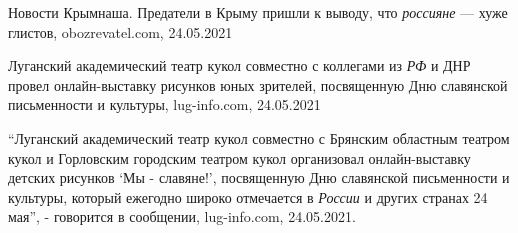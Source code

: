 
 
 
 
 
Новости Крымнаша. Предатели в Крыму пришли к выводу, что \emph{россияне} — хуже
глистов, obozrevatel.com, 24.05.2021

Луганский академический театр кукол совместно с коллегами из \emph{РФ} и ДНР
провел онлайн-выставку рисунков юных зрителей, посвященную Дню славянской
письменности и культуры, lug-info.com, 24.05.2021

\enquote{Луганский академический театр кукол совместно с Брянским областным театром
кукол и Горловским городским театром кукол организовал онлайн-выставку детских
рисунков \enquote{Мы - славяне!}, посвященную Дню славянской письменности и культуры,
который ежегодно широко отмечается в \emph{России} и других странах 24 мая}, -
говорится в сообщении, lug-info.com, 24.05.2021.
